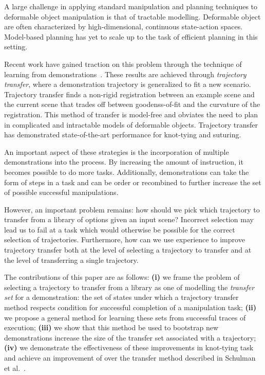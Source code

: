 A large challenge in applying standard manipulation and planning techniques to
deformable object manipulation is that of tractable modelling. Deformable object 
are often characterized by high-dimensional, continuous state-action spaces. Model-based 
planning has yet to scale up to the task of efficient planning in this
setting.

Recent work have gained traction on this problem through the technique of 
learning from demonstrations~\cite{Schulmanetal_ISRR2013,Schulmanetal_IROS2013}.
These results are achieved through \emph{trajectory transfer}, where a demonstration
trajectory is generalized to fit a new scenario. Trajectory transfer finds a non-rigid
registration between an example scene and the current scene that trades off between
goodenss-of-fit and the curvature of the registration. 
This method of transfer is model-free and obviates the need to plan in complicated
and intractable models of deformable objects. Trajectory transfer has demonstrated 
state-of-the-art performance for knot-tying and suturing.

An important aspect of these strategies is the incorporation of multiple demonstrations
into the process. By increasing the amount of instruction, it becomes possible to do more
tasks. Additionally, demonstrations can take the form of steps in a task and can be
order or recombined to further increase the set of possible successful manipulations.

However, an important problem remains: how should we pick which trajectory to transfer
from a library of options given an input scene? Incorrect selection may lead us
to fail at a task which would otherwise be possible for the correct selection of 
trajectories. Furthermore, how can we use experience to improve trajectory transfer 
both at the level of selecting a trajectory to transfer and at the level of transferring
a single trajectory.

The contributions of this paper are as follows: {\bf(i)} we frame the problem of selecting 
a trajectory to transfer from a library as one of modelling the \emph{transfer set} for a 
demonstration: the set of states under which a trajectory transfer method respects 
condition for successful completion of a manipulation task; {\bf(ii)} 
we propose a general method for learning these sets from successful traces of 
execution; {\bf(iii)} we show that this method be used to bootstrap new demonstrations
increase the size of the transfer set associated with a trajectory; {\bf(iv)} we demonstrate
the effectiveness of these improvements in knot-tying task and achieve an improvement 
of  over the transfer method described in Schulman et al.~\cite{Schulmanetal_ISRR2013}.



